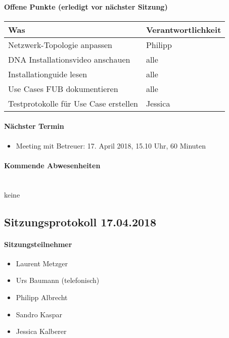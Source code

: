 \paragraph{Offene Punkte (erledigt vor nächster Sitzung)} \mbox{}

\begin{table}[H]
	\centering
	\begin{tabularx}{\textwidth}{X | p{4.5cm}}
		\rowcolor{gray!50}
		\textbf{Was} & \textbf{Verantwortlichkeit} \\
		\hline
		Netzwerk-Topologie anpassen & Philipp \\
		DNA Installationsvideo anschauen & alle \\
		Installationguide lesen & alle \\
		Use Cases FUB dokumentieren & alle \\	
		Testprotokolle für Use Case erstellen & Jessica \\
	\end{tabularx}
	\label{tab:my-label}
\end{table}

\paragraph{Nächster Termin}
\begin{itemize}	
	\item Meeting mit Betreuer: 17. April 2018, 15.10 Uhr, 60 Minuten
\end{itemize}

\paragraph{Kommende Abwesenheiten} \mbox{}\\
keine


\newpage



\subsection{Sitzungsprotokoll 17.04.2018}

\paragraph{Sitzungsteilnehmer}
\begin{itemize}	
	\item Laurent Metzger 
	\item Urs Baumann (telefonisch)
	\item Philipp Albrecht
	\item Sandro Kaspar
	\item Jessica Kalberer
\end{itemize}


